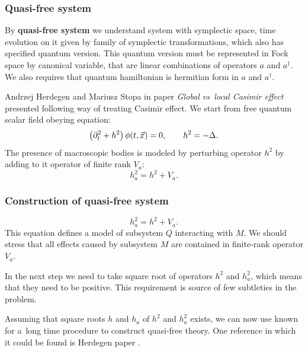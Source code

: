 \documentclass[10pt,t]{beamer}
\begin{document}
\begin{frame}
  \frametitle{Quasi-free system}


  By \textbf{quasi-free system} we understand system with symplectic space,
  time evolution on it given by family of symplectic transformations, which
  also has specified quantum version. This quantum version must be
  represented in Fock space by canonical variable, that are linear
  combinations of operators $a$ and $a^{ \dagger }$. We also requires that
  quantum hamiltonian is hermitian form in $a$ and $a^{ \dagger }$.

  Andrzej Herdegen and Mariusz Stopa in paper \textit{Global vs~local
    Casimir effect} \parencite{Herdegen-Stopa-Global-vs-local-ETC-2010}
  presented following way of treating Casimir effect. We start from
  free quantum scalar field obeying equation:
  \begin{equation}
    \label{eq:Construction-of-quasi-free-system-ETC-01}
    \left( \partial_{ t }^{ 2 } + h^{ 2 } \right) \phi( t, \vec{x} ) = 0, \qquad
    h^{ 2 } = -\Delta.
  \end{equation}
  The presence of macroscopic bodies is modeled by perturbing operator
  $h^{ 2 }$ by adding to it operator of finite rank $V_{ a }$:
  \begin{equation}
    \label{eq:Epstein-Glaser-24-A}
    h_{ a }^{ 2 } = h^{ 2 } + V_{ a }.
  \end{equation}

\end{frame}





\begin{frame}
  \frametitle{Construction of quasi-free system}


  \begin{equation}
    \label{eq:Construction-of-quasi-free-system-ETC-02}
    h_{ a }^{ 2 } = h^{ 2 } + V_{ a }.
  \end{equation}
  This equation defines a model of subsystem $Q$ interacting with $M$.
  We should stress that all effects caused by subsystem $M$ are contained
  in finite-rank operator $V_{ a }$.

  In the next step we need to take square root of operators $h^{ 2 }$
  and $h_{ a }^{ 2 }$, which means that they need to be positive. This
  requirement is source of few subtleties in the problem.

  Assuming that square roots $h$ and $h_{ a }$ of $h^{ 2 }$ and $h_{ a }^{ 2 }$
  exists, we can now use known for a~long time procedure to construct
  quasi-free theory. One reference in which it could be found is Herdegen
  paper \parencite{Herdegen-Quantum-backreaction-ETC-Part-I-Pub-2005}.

\end{frame}
\end{document}
